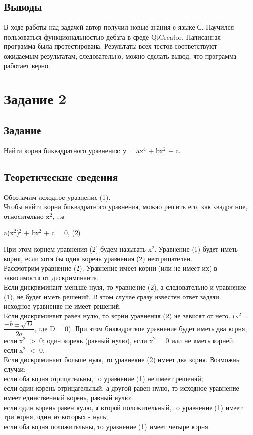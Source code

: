 \documentclass[12pt,a4paper]{report}
\begin{document}
\subsection{Выводы}
В ходе работы над задачей автор получил новые знания о языке С. Научился пользоваться функциональностью дебага в среде QtCreator. Написанная программа была протестирована. Результаты всех тестов соответствуют ожидаемым результатам, следовательно, можно сделать вывод, что программа работает верно. 

\section{Задание 2}
\subsection{Задание}
Найти корни биквадратного уравнения: y = ax$^{4}$ + bx$^{2}$ + c.
\subsection{Теоретические сведения}
Обозначим исходное уравнение (1). \\
Чтобы найти корни биквадратного уравнения, можно решить его, как квадратное, относительно x$^{2}$, т.е
\begin{center}
  a(x$^{2}$)$^{2}$ + bx$^{2}$ + c = 0,    (2)
\end{center} 
При этом корнем уравнения (2) будем называть x$^{2}$.
Уравнение (1) будет иметь корни, если хотя бы один корень уравнения (2) неотрицателен. \\
Рассмотрим уравнение (2). Уравнение имеет корни (или не имеет их) в зависимости от дискриминанта. \\
Если дискриминант меньше нуля, то уравнение (2), а следовательно и уравнение (1), не будет иметь решений. В этом случае сразу известен ответ задачи: исходное уравнение не имеет решений. \\
Если дискриминант равен нулю, то корни уравнения (2) не зависят от него. (x$^{2}$ = $\dfrac{-b \pm \sqrt{D}}{2a}$, где D = 0). При этом биквадратное уравнение будет иметь два корня, если x$^{2}$ $>$ 0; один корень (равный нулю), если x$^2$ = 0 или не иметь корней, если x$^{2}$ $<$ 0. \\ 
Если дискриминант больше нуля, то уравнение (2) имеет два корня. Возможны случаи: \\
если оба корня отрицательны, то уравнение (1) не имеет решений; \\
если один корень отрицательный, а другой равен нулю, то исходное уравнение имеет единственный корень, равный нулю; \\
если один корень равен нулю, а второй положительный, то уравнение (1) имеет три корня, один из которых - нуль; \\
если оба корня положительны, то уравнение (1) имеет четыре корня. 
\end{document}
